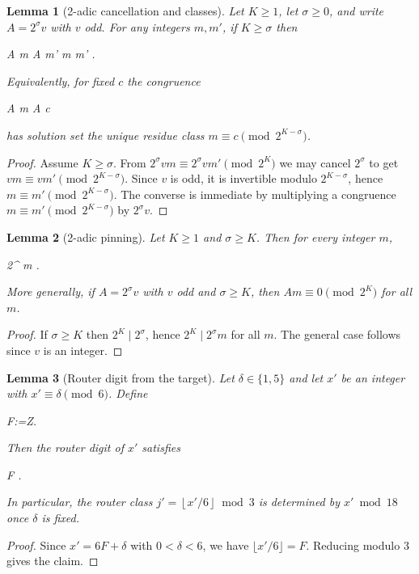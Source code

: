 \documentclass[11pt,letterpaper]{amsart}
\def\mathbb#1{#1}%
\def\[{ }%
\def\]{ }%
\theoremstyle{definition}
\theoremstyle{plain}
\newtheorem{lemma}{Lemma}
\theoremstyle{plain}
\theoremstyle{remark}
\begin{document}
\begin{lemma}[2-adic cancellation and classes]
\label{lem:2adic-cancellation}
Let $K\ge 1$, let $\sigma \ge 0$, and write $A=2^{\sigma} v$ with $v$ odd.
For any integers $m,m'$, if $K\ge \sigma$ then
\[
A m \equiv A m' 
\quad\Longleftrightarrow\quad
m \equiv m' .
\]
Equivalently, for fixed $c$ the congruence
\[
A m \equiv A c 
\]
has solution set the unique residue class $m\equiv c \pmod{2^{K-\sigma}}$.
\end{lemma}

\begin{proof}
Assume $K\ge \sigma$. From $2^{\sigma} v m \equiv 2^{\sigma} v m' \pmod{2^K}$ we may cancel $2^{\sigma}$ to get
$v m \equiv v m' \pmod{2^{K-\sigma}}$.
Since $v$ is odd, it is invertible modulo $2^{K-\sigma}$, hence $m\equiv m' \pmod{2^{K-\sigma}}$.
The converse is immediate by multiplying a congruence $m\equiv m' \pmod{2^{K-\sigma}}$ by $2^{\sigma} v$.
\end{proof}


\begin{lemma}[2-adic pinning]
\label{lem:2adic-pinning}
Let $K\ge 1$ and $\sigma\ge K$.  Then for every integer $m$,
\[
2^{\sigma} m  .
\]
More generally, if $A=2^{\sigma} v$ with $v$ odd and $\sigma\ge K$, then $A m \equiv 0 \pmod{2^K}$ for all $m$.
\end{lemma}

\begin{proof}
If $\sigma\ge K$ then $2^K \mid 2^{\sigma}$, hence $2^K\mid 2^{\sigma} m$ for all $m$.
The general case follows since $v$ is an integer.
\end{proof}


\begin{lemma}[Router digit from the target]
\label{lem:router-from-target}
Let $\delta\in\{1,5\}$ and let $x'$ be an integer with $x'\equiv \delta\pmod 6$.
Define
\[
F:=\in\mathbb Z.
\]
Then the router digit of $x'$ satisfies
\[
\left\lfloor{}\right\rfloor \equiv F .
\]
In particular, the router class $j'=\left\lfloor x'/6\right\rfloor\bmod 3$ is determined by $x'\bmod 18$ once $\delta$ is fixed.
\end{lemma}

\begin{proof}
Since $x'=6F+\delta$ with $0<\delta<6$, we have $\lfloor x'/6\rfloor = F$. Reducing modulo $3$ gives the claim.
\end{proof}
\end{document}
